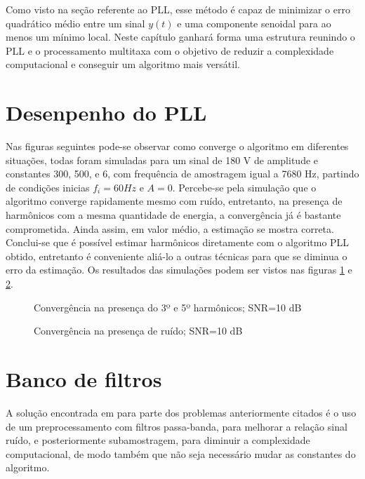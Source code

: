	
Como visto na seção referente ao PLL, esse método é capaz de minimizar o erro quadrático médio entre um sinal $y(t)$ e uma componente senoidal para ao menos um mínimo local. Neste capítulo ganhará forma uma estrutura reunindo o PLL e o processamento multitaxa com o objetivo de reduzir a complexidade computacional e conseguir um algoritmo mais versátil. 

\section{Desenpenho do PLL}
Nas figuras seguintes pode-se observar como converge o algoritmo em diferentes situações, todas foram simuladas para um sinal de 180 V de amplitude e constantes 300, 500, e 6, com frequência de amostragem igual a 7680 Hz, partindo de condições inicias $f_i=60 Hz$ e $A=0$. Percebe-se pela simulação que o algoritmo converge rapidamente mesmo com ruído, entretanto, na presença de harmônicos com a mesma quantidade de energia, a convergência já é bastante comprometida. Ainda assim, em valor médio, a estimação se mostra correta. Conclui-se que é possível estimar harmônicos diretamente com o algoritmo PLL obtido, entretanto é conveniente aliá-lo a outras técnicas para que se diminua o erro da estimação. Os resultados das simulações podem ser vistos nas figuras \ref{fig:PLL_conv1} e \ref{fig:PLL_conv2}.

\begin{figure}[h]
	\centering    
	\def\svgwidth{\columnwidth}
	
	\caption{Convergência na presença do 3º e 5º harmônicos; SNR=10 dB}
	\label{fig:PLL_conv1}
\end{figure}

\begin{figure}[h]
	\centering    
	\def\svgwidth{\columnwidth}
	
	\caption{Convergência na presença de ruído; SNR=10 dB}
	\label{fig:PLL_conv2}
\end{figure}

\section{Banco de filtros}

\indent A solução encontrada em \cite{de2009pll} para parte dos problemas anteriormente citados é o uso de um preprocessamento com filtros passa-banda, para melhorar a relação sinal ruído, e posteriormente subamostragem, para diminuir a complexidade computacional, de modo também que não seja necessário mudar as constantes do algoritmo.


